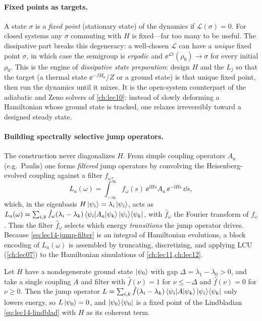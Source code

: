 \paragraph{Fixed points as targets.}
A state $\sigma$ is a \emph{fixed point} (stationary state) of the dynamics if $\mathcal L(\sigma)
=0$. For closed systems any $\sigma$ commuting with $H$ is fixed---far too many to be useful. The
dissipative part breaks this degeneracy: a well-chosen $\mathcal L$ can have a \emph{unique} fixed
point $\sigma$, in which case the semigroup is \emph{ergodic} and $\ee^{\mathcal L t}(\rho_0)\to
\sigma$ for every initial $\rho_0$. This is the engine of \emph{dissipative state preparation}:
design $H$ and the $L_j$ so that the target (a thermal state $\ee^{-\beta H_0}/Z$ or a ground
state) is that unique fixed point, then run the dynamics until it mixes. It is the open-system
counterpart of the adiabatic and Zeno solvers of \cref{ch:lec10}: instead of slowly deforming a
Hamiltonian whose ground state is tracked, one relaxes irreversibly toward a designed steady
state.

\paragraph{Building spectrally selective jump operators.}
The construction never diagonalizes $H$. From simple coupling operators $A_a$ (e.g.\ Paulis) one
forms \emph{filtered} jump operators by convolving the Heisenberg-evolved coupling against a
filter $f_\omega$,
\begin{equation}
  L_a(\omega)=\int_{-\infty}^{\infty}f_\omega(s)\,\ee^{\ii Hs}A_a\,\ee^{-\ii Hs}\,\dd s,
  \label{eq:lec14-jump-filter}
\end{equation}
which, in the eigenbasis $H\ket{\psi_i}=\lambda_i\ket{\psi_i}$, acts as $L_a(\omega)=\sum_{i,k}
\hat f_\omega(\lambda_i-\lambda_k)\braket{\psi_i|A_a|\psi_k}\ket{\psi_i}\!\bra{\psi_k}$, with
$\hat f_\omega$ the Fourier transform of $f_\omega$. Thus the filter $\hat f_\omega$ selects which
energy \emph{transitions} the jump operator drives. Because \eqref{eq:lec14-jump-filter} is an
integral of Hamiltonian evolutions, a block encoding of $L_a(\omega)$ is assembled by truncating,
discretizing, and applying LCU (\cref{ch:lec07}) to the Hamiltonian simulations of
\cref{ch:lec11,ch:lec12}.

\begin{proposition}
\label{prop:lec14-darkstate}
Let $H$ have a nondegenerate ground state $\ket{\psi_0}$ with gap $\Delta=\lambda_1-\lambda_0>0$,
and take a single coupling $A$ and filter with $\hat f(\nu)=1$ for $\nu\le-\Delta$ and
$\hat f(\nu)=0$ for $\nu\ge0$. Then the jump operator $L=\sum_{i,k}\hat f(\lambda_i-\lambda_k)
\braket{\psi_i|A|\psi_k}\ket{\psi_i}\!\bra{\psi_k}$ only lowers energy, so $L\ket{\psi_0}=0$, and
$\ket{\psi_0}\!\bra{\psi_0}$ is a fixed point of the Lindbladian \eqref{eq:lec14-lindblad} with $H$ as its
coherent term.
\end{proposition}


